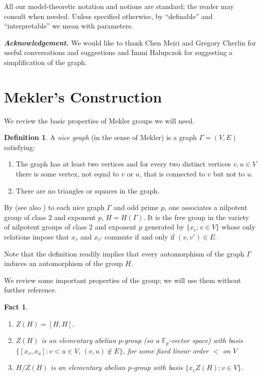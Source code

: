 \documentclass[11pt]{amsart}
\theoremstyle{plain}
\newtheorem{fact}[theorem]{Fact}
\theoremstyle{definition}
\newtheorem{definition}[theorem]{Definition}
\theoremstyle{remark}
\numberwithin{equation}{section}
\begin{document}
All our model-theoretic notation and notions are standard; the reader may consult \cite{Hodges} when needed. Unless specified otherwise, by ``definable'' and ``interpretable'' we mean with parameters.

\vspace{0.2cm}
\noindent\emph{\textbf{Acknowledgement.}} We would like to thank Chen Meiri and Gregory Cherlin for useful conversations and suggestions and Immi Halupczok
for suggesting a simplification of the graph.



\section{Mekler's Construction}
We review the basic properties of Mekler groups we will need.

\begin{definition}\cite[Definition 1.1]{Mek:stability}
    A \emph{nice graph} (in the sense of Mekler) is a graph $\Gamma=(V,E)$ satisfying:
    \begin{enumerate}
        \item The graph has at least two vertices and for every two distinct vertices $v,u\in V$ there is some vertex, not equal to $v$ or $u$, that is connected to $v$ but not to $u$.
        \item There are no triangles or squares in the graph.
    \end{enumerate}
\end{definition}

By \cite[Definition 2.1]{Mek:stability} (see also \cite[Appendix A.3]{Hodges}) to each nice graph $\Gamma$  and odd prime $p$, one associates a nilpotent group of class $2$ and  exponent $p$,  $H=H(\Gamma)$. It is the free group in the variety of nilpotent groups of class $2$ and  exponent $p$ generated by $\{x_v: v\in V\}$ whose only relations impose that $x_v$ and $x_{v'}$ commute if and only if $(v,v')\in E$.

Note that the definition readily implies that every automorphism of the graph $\Gamma$ induces an automorphism of the group $H$.

We review some important properties of the group; we will use them without further reference.

\begin{fact}\label{F:properties of Mekler group}\cite[Appendix A.3]{Hodges}
    \begin{enumerate}
        \item $Z(H)=[H,H]$.
        \item $Z(H)$ is an elementary abelian $p$-group (so a $\mathbb{F}_p$-vector space) with basis $\{[x_v,x_u]: v<u\in V,\, (v,u)\notin E\}$, for some fixed linear order $<$ on $V$
        \item $H/Z(H)$ is an elementary abelian $p$-group  with basis $\{x_vZ(H):v\in V\}$.
    \end{enumerate}
\end{fact}
\end{document}
